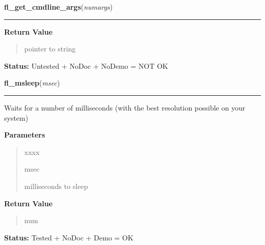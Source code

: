 \hspace{.8\funcindent}\begin{boxedminipage}{\funcwidth}

    \raggedright \textbf{fl\_get\_cmdline\_args}(\textit{numargs})

    \vspace{-1.5ex}

    \rule{\textwidth}{0.5\fboxrule}
\setlength{\parskip}{2ex}
\setlength{\parskip}{1ex}
      \textbf{Return Value}
    \vspace{-1ex}

      \begin{quote}
      pointer to string

      \end{quote}

\textbf{Status:} Untested + NoDoc + NoDemo = NOT OK



    \end{boxedminipage}

    \label{xformslib:library:fl_msleep}

    \vspace{0.5ex}

\hspace{.8\funcindent}\begin{boxedminipage}{\funcwidth}

    \raggedright \textbf{fl\_msleep}(\textit{msec})

    \vspace{-1.5ex}

    \rule{\textwidth}{0.5\fboxrule}
\setlength{\parskip}{2ex}
    Waits for a number of milliseconds (with the best resolution possible 
    on your system)

\setlength{\parskip}{1ex}
      \textbf{Parameters}
      \vspace{-1ex}

      \begin{quote}
        \begin{Ventry}{xxxx}

          \item[msec]

          milliseconds to sleep

        \end{Ventry}

      \end{quote}

      \textbf{Return Value}
    \vspace{-1ex}

      \begin{quote}
      num

      \end{quote}

\textbf{Status:} Tested + NoDoc + Demo = OK



    \end{boxedminipage}


